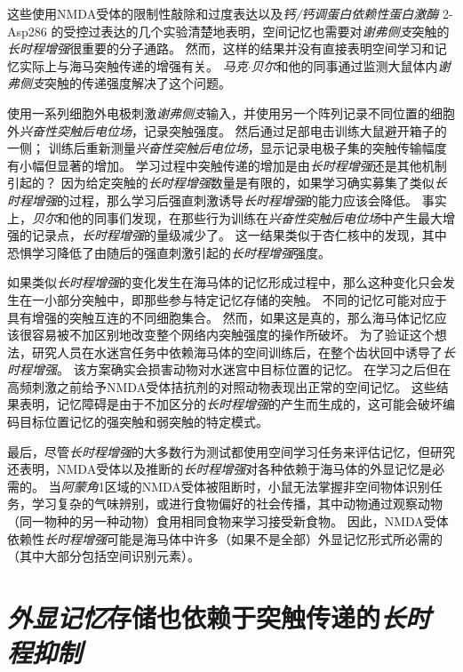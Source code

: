 这些使用NMDA受体的限制性敲除和过度表达以及\textit{钙/钙调蛋白依赖性蛋白激酶} 2-Asp286 的受控过表达的几个实验清楚地表明，空间记忆也需要对\textit{谢弗侧支}突触的\textit{长时程增强}很重要的分子通路。
然而，这样的结果并没有直接表明空间学习和记忆实际上与海马突触传递的增强有关。
\textit{马克$\cdot$贝尔}和他的同事通过监测大鼠体内\textit{谢弗侧支}突触的传递强度解决了这个问题。


使用一系列细胞外电极刺激\textit{谢弗侧支}输入，并使用另一个阵列记录不同位置的细胞外\textit{兴奋性突触后电位场}，记录突触强度。
然后通过足部电击训练大鼠避开箱子的一侧；
训练后重新测量\textit{兴奋性突触后电位场}，显示记录电极子集的突触传输幅度有小幅但显著的增加。
学习过程中突触传递的增加是由\textit{长时程增强}还是其他机制引起的？
因为给定突触的\textit{长时程增强}数量是有限的，如果学习确实募集了类似\textit{长时程增强}的过程，那么学习后强直刺激诱导\textit{长时程增强}的能力应该会降低。
事实上，\textit{贝尔}和他的同事们发现，在那些行为训练在\textit{兴奋性突触后电位场}中产生最大增强的记录点，\textit{长时程增强}的量级减少了。
这一结果类似于杏仁核中的发现，其中恐惧学习降低了由随后的强直刺激引起的\textit{长时程增强}强度。


如果类似\textit{长时程增强}的变化发生在海马体的记忆形成过程中，那么这种变化只会发生在一小部分突触中，即那些参与特定记忆存储的突触。
不同的记忆可能对应于具有增强的突触互连的不同细胞集合。
然而，如果这是真的，那么海马体记忆应该很容易被不加区别地改变整个网络内突触强度的操作所破坏。
为了验证这个想法，研究人员在水迷宫任务中依赖海马体的空间训练后，在整个齿状回中诱导了\textit{长时程增强}。
该方案确实会损害动物对水迷宫中目标位置的记忆。
在学习之后但在高频刺激之前给予NMDA受体拮抗剂的对照动物表现出正常的空间记忆。
这些结果表明，记忆障碍是由于不加区分的\textit{长时程增强}的产生而生成的，这可能会破坏编码目标位置记忆的强突触和弱突触的特定模式。


最后，尽管\textit{长时程增强}的大多数行为测试都使用空间学习任务来评估记忆，但研究还表明，NMDA受体以及推断的\textit{长时程增强}对各种依赖于海马体的外显记忆是必需的。
当\textit{阿蒙角}1区域的NMDA受体被阻断时，小鼠无法掌握非空间物体识别任务，学习复杂的气味辨别，或进行食物偏好的社会传播，其中动物通过观察动物（同一物种的另一种动物）食用相同食物来学习接受新食物。
因此，NMDA受体依赖性\textit{长时程增强}可能是海马体中许多（如果不是全部）外显记忆形式所必需的（其中大部分包括空间识别元素）。



\section{\textit{外显记忆}存储也依赖于突触传递的\textit{长时程抑制}}

